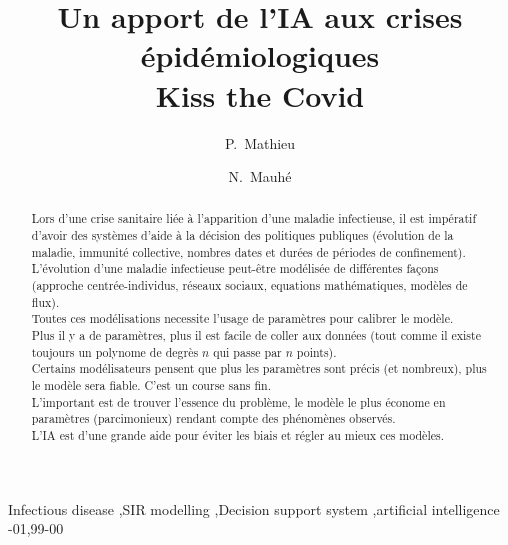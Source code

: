 \documentclass[review]{elsarticle}
\begin{document}
\begin{frontmatter}

\title{Un apport de l’IA aux crises épidémiologiques \\ Kiss the Covid}



\author[cristal]{P.~Mathieu}

\fntext[fn1]{}

\author[cristal]{N.~Mauhé}

\address[cristal]{Univ. Lille, CNRS, Centrale Lille, UMR 9189 --  CRIStAL Lab, F-59000 Lille, France}


\begin{abstract}
  Lors d'une crise sanitaire liée à l'apparition d'une maladie
  infectieuse, il est impératif d'avoir des systèmes d'aide à la
  décision des politiques publiques (évolution de la maladie, immunité
  collective, nombres dates et durées de périodes de
  confinement). \\
  L'évolution d'une maladie infectieuse peut-être modélisée de
  différentes façons (approche centrée-individus, réseaux sociaux,
  equations mathématiques, modèles de flux).\\
  Toutes ces modélisations necessite l'usage de paramètres pour
  calibrer le modèle.\\
  Plus il y a de paramètres, plus il est facile de coller aux
  données (tout comme il existe toujours un polynome de degrès $n$ qui passe par $n$ points).\\
  Certains modélisateurs pensent que plus les paramètres sont précis
  (et nombreux), plus le modèle sera fiable. C'est un course
  sans fin.\\
  L'important est de trouver l'essence du problème, le modèle le plus
  économe en paramètres (parcimonieux) rendant compte des
  phénomènes observés. \\
  L'IA est d'une grande aide pour éviter les biais et régler au mieux
  ces modèles.
\end{abstract}

\begin{keyword}
Infectious disease \sep SIR modelling \sep Decision support system \sep artificial intelligence
-01\sep  99-00
\end{keyword}

\end{frontmatter}
\end{document}
